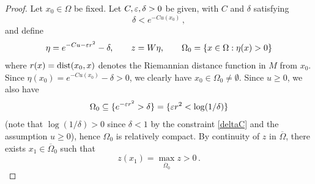\documentclass[10 pt,a4paper]{article}
\theoremstyle{definition}
\begin{document}
\begin{proof}
	Let $x_0\in\Omega$ be fixed. Let $C,\varepsilon,\delta>0$ be given, with $C$ and $\delta$ satisfying
	\begin{equation} \label{deltaC}
		\delta < e^{-Cu(x_0)} \, ,
	\end{equation}
	and define
	\[
		\eta = e^{-Cu-\varepsilon r^2} - \delta, \qquad z = W \eta, \qquad \Omega_0 = \{ x \in \Omega : \eta(x) > 0 \}
	\]
	where $r(x) = \mathrm{dist}(x_0,x)$ denotes the Riemannian distance function in $M$ from $x_0$. Since $\eta(x_0) = e^{-Cu(x_0)} - \delta > 0$, we clearly have $x_0 \in \Omega_0 \neq \emptyset$. Since $u\geq 0$, we also have
	\begin{equation} \label{Omega0}
		\Omega_0 \subseteq \{ e^{-\varepsilon r^2} > \delta \} = \{ \varepsilon r^2 < \log(1/\delta) \}
	\end{equation}
	(note that $\log(1/\delta) > 0$ since $\delta<1$ by the constraint \eqref{deltaC} and the assumption $u\geq 0$), hence $\Omega_0$ is relatively compact. By continuity of $z$ in $\overline{\Omega}$, there exists $x_1\in\overline{\Omega}_0$ such that
	\[
		z(x_1) = \max_{\overline{\Omega}_0} z > 0 \, .
	\]
	

\end{proof}
\end{document}
